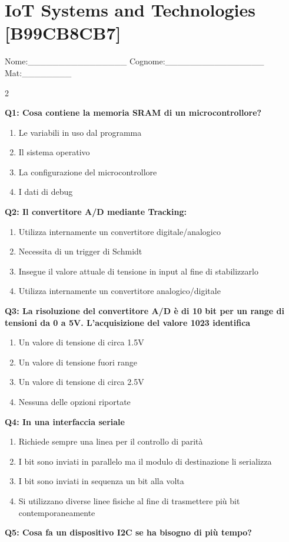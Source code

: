 \documentclass[10pt]{article}
\begin{document}
\section*{IoT Systems and Technologies \footnotesize [B99CB8CB7]}
{\footnotesize Nome:\_\_\_\_\_\_\_\_\_\_\_\_\_\_\_\_ Cognome:\_\_\_\_\_\_\_\_\_\_\_\_\_\_\_\_ Mat:\_\_\_\_\_\_\_\_}
\begin{multicols}{2}

\textbf{Q1: Cosa contiene la memoria SRAM di un microcontrollore?}

\begin{enumerate}[label=\arabic*.]
\item Le variabili in uso dal programma
\item Il sistema operativo
\item La configurazione del microcontrollore
\item I dati di debug
\end{enumerate}
\textbf{Q2: Il convertitore A/D mediante Tracking:}

\begin{enumerate}[label=\arabic*.]
\item Utilizza internamente un convertitore digitale/analogico
\item Necessita di un trigger di Schmidt
\item Insegue il valore attuale di tensione in input al fine di stabilizzarlo
\item Utilizza internamente un convertitore analogico/digitale
\end{enumerate}
\textbf{Q3: La risoluzione del convertitore A/D è di 10 bit per un range di tensioni da 0 a 5V. L'acquisizione del valore 1023 identifica}

\begin{enumerate}[label=\arabic*.]
\item Un valore di tensione di circa 1.5V
\item Un valore di tensione fuori range
\item Un valore di tensione di circa 2.5V
\item Nessuna delle opzioni riportate
\end{enumerate}
\textbf{Q4: In una interfaccia seriale}

\begin{enumerate}[label=\arabic*.]
\item Richiede sempre una linea per il controllo di parità
\item I bit sono inviati in parallelo ma il modulo di destinazione li serializza
\item I bit sono inviati in sequenza un bit alla volta
\item Si utilizzano diverse linee fisiche al fine di trasmettere più bit contemporaneamente
\end{enumerate}
\textbf{Q5: Cosa fa un dispositivo I2C se ha bisogno di più tempo?}


\end{multicols}
\end{document}
